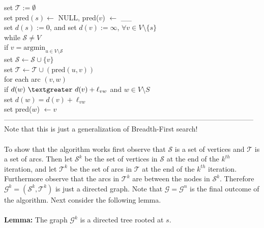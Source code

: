 \documentclass{article}
\newcommand{\emp}{\emptyset}
\newcommand{\gt}{\textgreater}
\newcommand{\lem}{\textbf{Lemma: }}
\newcommand{\ds}{\displaystyle}
\newcommand{\mcal}[1]{\mathcal{#1}}
\begin{document}
	\hspace*{7mm} set $\mcal{T} := \emp$\\
	\hspace*{7mm} set $\text{pred}(s) \leftarrow$ NULL, pred($v$) $\leftarrow$ \_\_\\
	\hspace*{7mm} set $d(s) := 0$, and set $d(v) := \infty$, $\forall v \in V\setminus \{s\}$\\
	\hspace*{7mm} while $\mcal{S} \neq V$\\
	\hspace*{14mm} if $\ds v = \text{argmin}_{u \in V \setminus \mcal{S}}$\\
	\hspace*{21mm} set $\mcal{S} \leftarrow \mcal{S} \cup \{v\}$\\
	\hspace*{21mm} set $\mcal{T} \leftarrow \mcal{T} \cup (\text{pred}(u, v))$\\
	\hspace*{14mm} for each arc $(v, w)$\\
	\hspace*{21mm} if $d(w)\ \gt\ d(v) + \ell_{vw}$ and $w \in V\setminus S$\\
	\hspace*{28mm} set $d(w) = d(v) + \ell_{vw}$\\
	\hspace*{28mm} set pred($w$) $\leftarrow v$\\
---------------------------------------------------------------------------------------------------------\\
Note that this is just a generalization of Breadth-First search!\\\\
To show that the algorithm works first observe that $\mcal{S}$ is a set of vertices and $\mcal{T}$ is a set of arcs. Then let $\mcal{S}^k$ be the set of vertices in $\mcal{S}$ at the end of the $k^{th}$ iteration, and let $\mcal{T}^k$ be the set of arcs in $\mcal{T}$ at the end of the $k^{th}$ iteration. Furthermore observe that the arcs in $\mcal{T}^k$ are between the nodes in $\mcal{S}^k$. Therefore $\mcal{G}^k = (\mcal{S}^k, \mcal{T}^k)$ is just a directed graph. Note that $\mcal{G} = \mcal{G}^n$ is the final outcome of the algorithm.  Next consider the following lemma.\\\\
\lem The graph $\mcal{G}^k$ is a directed tree rooted at $s$.\\\\
\end{document}
